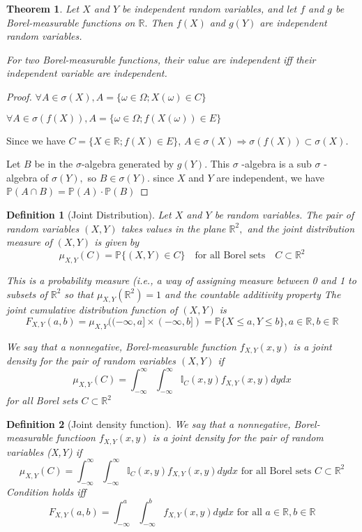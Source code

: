 \documentclass[a4]{article}
\newtheorem{theorem}{Theorem}
\newtheorem{definition}{Definition}
\begin{document}
\begin{theorem}
Let $X$ and $Y$ be independent random variables, and let $f$ and $g$ be Borel-measurable functions on $\mathbb{R} .$ Then $f(X)$ and $g(Y)$ are independent random variables.\par 
\bigbreak 
For two Borel-measurable functions, their value are independent iff their independent variable are independent.
\end{theorem}
\begin{proof}
	$\forall A\in \sigma(X), A = \{\omega\in \Omega;X(\omega)\in C \}$\par \bigbreak 
	$\forall A\in \sigma(f(X)), A = \{\omega\in \Omega; f(X(\omega))\in E\}$\par \bigbreak 
	Since we have $C
	= \{X\in \mathbb{R}; f(X)\in E\}$, $A\in \sigma(X)\Rightarrow \sigma(f(X))\subset \sigma(X)$. \par \bigbreak 
	\noindent Let $B$ be in the $\sigma$-algebra generated by $g(Y) .$ This $\sigma$ -algebra is a sub $\sigma$ -algebra of $\sigma(Y),$ so $B \in \sigma(Y) .$ since $X$ and $Y$ are independent, we have $\mathbb{P}(A \cap B)=\mathbb{P}(A) \cdot \mathbb{P}(B)$
\end{proof}
\begin{definition}[Joint Distribution]
	Let $X$ and $Y$ be random variables. The pair of random variables $(X, Y)$ takes values in the plane $\mathbb{R}^{2},$ and the joint distribution measure of $(X, Y)$ is given $by$
	$$\mu_{X, Y}(C)=\mathbb{P}\{(X, Y) \in C\}\quad\text{for all Borel sets} \quad C \subset \mathbb{R}^{2}$$\par \bigbreak 
	\noindent This is a probability measure (i.e., a way of assigning measure between 0 and
	1 to subsets of $\mathbb{R}^{2}$ so that $\mu_{X, Y}\left(\mathbb{R}^{2}\right)=1$ and the countable additivity property The joint cumulative distribution function of $(X, Y)$ is
	$$
	F_{X, Y}(a, b)=\mu_{X, Y}((-\infty, a] \times(-\infty, b])=\mathbb{P}\{X \leq a, Y \leq b\}, a \in \mathbb{R}, b \in \mathbb{R}
	$$\par \bigbreak 
\noindent We say that a nonnegative, Borel-measurable function $f_{X, Y}(x, y)$ is a joint density for the pair of random variables $(X, Y)$ if
$$\mu_{X, Y}(C)=\int_{-\infty}^{\infty} \int_{-\infty}^{\infty} \mathbb{I}_{C}(x, y) f_{X, Y}(x, y) d y d x$$ for all Borel sets $C \subset \mathbb{R}^{2}$
\end{definition}
\begin{definition}[Joint density function]
	We say that a nonnegative, Borel-measurable functioon $f_{X,Y}(x,y)$ is a joint density for the pair of random variables (X,Y) if
	$$
	\mu_{X, Y}(C)=\int_{-\infty}^{\infty} \int_{-\infty}^{\infty} \mathbb{I}_{C}(x, y) f_{X, Y}(x, y) d y d x \text { for all Borel sets } C \subset \mathbb{R}^{2}
	$$
	Condition holds iff 
	$$
	F_{X, Y}(a, b)=\int_{-\infty}^{a} \int_{-\infty}^{b} f_{X, Y}(x, y) d y d x \text { for all } a \in \mathbb{R}, b \in \mathbb{R}
	$$
\end{definition}
\end{document}
